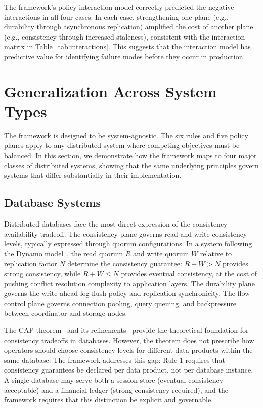 \documentclass[conference]{IEEEtran}
\begin{document}
The framework's policy interaction model correctly predicted the negative interactions in all four cases. In each case, strengthening one plane (e.g., durability through asynchronous replication) amplified the cost of another plane (e.g., consistency through increased staleness), consistent with the interaction matrix in Table~\ref{tab:interactions}. This suggests that the interaction model has predictive value for identifying failure modes before they occur in production.

\section{Generalization Across System Types}

The framework is designed to be system-agnostic. The six rules and five policy planes apply to any distributed system where competing objectives must be balanced. In this section, we demonstrate how the framework maps to four major classes of distributed systems, showing that the same underlying principles govern systems that differ substantially in their implementation.

\subsection{Database Systems}

Distributed databases face the most direct expression of the consistency-availability tradeoff. The consistency plane governs read and write consistency levels, typically expressed through quorum configurations. In a system following the Dynamo model~\cite{dynamo}, the read quorum $R$ and write quorum $W$ relative to replication factor $N$ determine the consistency guarantee: $R + W > N$ provides strong consistency, while $R + W \leq N$ provides eventual consistency, at the cost of pushing conflict resolution complexity to application layers. The durability plane governs the write-ahead log flush policy and replication synchronicity. The flow-control plane governs connection pooling, query queuing, and backpressure between coordinator and storage nodes.

The CAP theorem~\cite{brewer2000cap} and its refinements~\cite{brewer2012cap} provide the theoretical foundation for consistency tradeoffs in databases. However, the theorem does not prescribe how operators should choose consistency levels for different data products within the same database. The framework addresses this gap: Rule 1 requires that consistency guarantees be declared per data product, not per database instance. A single database may serve both a session store (eventual consistency acceptable) and a financial ledger (strong consistency required), and the framework requires that this distinction be explicit and governable.
\end{document}
